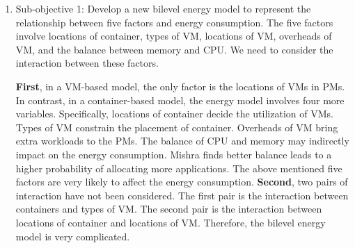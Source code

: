 \begin{enumerate}
	\item Sub-objective 1: Develop a new bilevel energy model to represent the relationship between five factors and energy consumption. The five factors involve locations of container, types of VM, locations of VM, overheads of VM, and the balance between memory and CPU. We need to consider the interaction between these factors.

	\textbf{First}, in a VM-based model, the only factor is the locations of VMs in PMs. In contrast, in a container-based model,  the energy model involves four more variables. Specifically, locations of container decide the utilization of VMs. Types of VM constrain the placement of container. Overheads of VM bring extra workloads to the PMs. The balance of CPU and memory may indirectly impact on the energy consumption. Mishra \cite{Mishra:2011bz} finds better balance leads to a higher probability of allocating more applications. The above mentioned five factors are very likely to affect the energy consumption. \textbf{Second}, two pairs of interaction have not been considered. The first pair is the interaction between containers and types of VM. The second pair is the interaction between locations of container and locations of VM. Therefore, the bilevel energy model is very complicated.



\end{enumerate}
